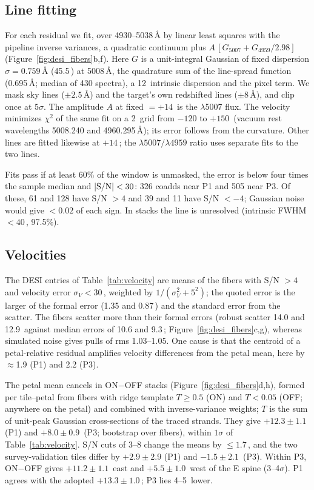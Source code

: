 \subsection{Line fitting}

For each residual we fit, over 4930--5038\,\AA{} by linear least squares with the pipeline inverse variances, a quadratic continuum plus $A\,[G_{5007}+G_{4959}/2.98]$ (Figure~\ref{fig:desi_fibers}b,f). Here $G$ is a unit-integral Gaussian of fixed dispersion $\sigma=0.759$\,\AA{} (45.5\,\kms) at 5008\,\AA, the quadrature sum of the line-spread function (0.695\,\AA; median of 430 spectra), a 12\,\kms{} intrinsic dispersion and the pixel term. We mask sky lines ($\pm2.5$\,\AA) and the target's own redshifted lines ($\pm8$\,\AA), and clip once at $5\sigma$. The amplitude $A$ at fixed \vhel{} $=+14$\,\kms{} is the $\lambda$5007 flux. The velocity minimizes $\chi^2$ of the same fit on a 2\,\kms{} grid from $-120$ to $+150$\,\kms{} (vacuum rest wavelengths 5008.240 and 4960.295\,\AA); its error follows from the curvature. Other lines are fitted likewise at $+14$\,\kms; the $\lambda5007/\lambda4959$ ratio uses separate fits to the two lines.

Fits pass if at least 60\% of the window is unmasked, the error is below four times the sample median and $|{\rm S/N}|<30$: 326 coadds near P1 and 505 near P3. Of these, 61 and 128 have S/N $>4$ and 39 and 11 have S/N $<-4$; Gaussian noise would give $<0.02$ of each sign. In stacks the line is unresolved (intrinsic FWHM $<40$\,\kms, 97.5\%).

\subsection{Velocities}

The DESI entries of Table~\ref{tab:velocity} are means of the fibers with S/N $>4$ and velocity error $\sigma_V<30$\,\kms, weighted by $1/(\sigma_V^2+5^2)$; the quoted error is the larger of the formal error (1.35 and 0.87\,\kms) and the standard error from the scatter. The fibers scatter more than their formal errors (robust scatter 14.0 and 12.9\,\kms{} against median errors of 10.6 and 9.3\,\kms; Figure~\ref{fig:desi_fibers}c,g), whereas simulated noise gives pulls of rms 1.03--1.05. One cause is that the centroid of a petal-relative residual amplifies velocity differences from the petal mean, here by $\approx$1.9 (P1) and 2.2 (P3).

The petal mean cancels in ON$-$OFF stacks (Figure~\ref{fig:desi_fibers}d,h), formed per tile--petal from fibers with ridge template $T\ge0.5$ (ON) and $T<0.05$ (OFF; anywhere on the petal) and combined with inverse-variance weights; $T$ is the sum of unit-peak Gaussian cross-sections of the traced strands. They give $+12.3\pm1.1$ (P1) and $+8.0\pm0.9$\,\kms{} (P3; bootstrap over fibers), within $1\sigma$ of Table~\ref{tab:velocity}. S/N cuts of 3--8 change the means by $\le1.7$\,\kms, and the two survey-validation tiles differ by $+2.9\pm2.9$ (P1) and $-1.5\pm2.1$\,\kms{} (P3). Within P3, ON$-$OFF gives $+11.2\pm1.1$\,\kms{} east and $+5.5\pm1.0$\,\kms{} west of the E spine (3--4$\sigma$). P1 agrees with the adopted $+13.3\pm1.0$\,\kms; P3 lies 4--5\,\kms{} lower.

